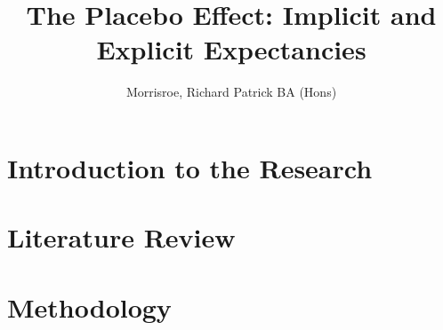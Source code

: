 \documentclass[apsych, phd]{uccthesis}
\title{The Placebo Effect: Implicit and Explicit Expectancies}
\author{Morrisroe, Richard Patrick BA (Hons)}
\begin{document}
\maketitle


\tableofcontents

\chapter{Introduction to the Research}
\label{cha:intr-rese}


\chapter{Literature Review}
\label{cha:literature-review}

\chapter{Methodology}
\label{cha:methodology}
% 


% 



% 
% 

% 

% 
% 


\end{document}
